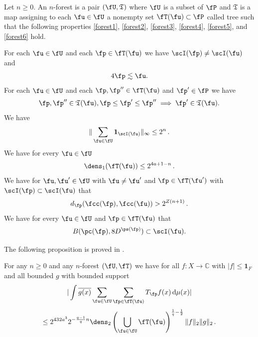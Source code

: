 Let $n\ge 0$.
An $n$-forest is a pair $(\fU, \mathfrak{T})$
where $\fU$ is a subset of $\fP$
and $\mathfrak{T}$ is a map assigning to
each $\fu\in \fU$ a nonempty set $\fT (\fu)\subset \fP$ called tree
such that the following properties
\eqref{forest1}, \eqref{forest2},
\eqref{forest3},
\eqref{forest4},
\eqref{forest5}, and
\eqref{forest6}
hold.

For each $\fu\in \fU$ and each $\fp\in \fT(\fu)$
we have $\scI(\fp) \ne \scI(\fu)$ and
\begin{equation}\label{forest1}
    4\fp\lesssim \fu.
\end{equation}
For each $\fu \in \fU$ and each $\fp,\fp''\in \fT(\fu)$ and $\fp'\in \fP$
we have
\begin{equation}\label{forest2}
    \fp, \fp'' \in \mathfrak{T}(\fu), \fp \leq \fp' \leq \fp'' \implies \fp' \in \mathfrak{T}(\fu).
\end{equation}
We have
\begin{equation}\label{forest3}
   \|\sum_{\fu\in \fU} \mathbf{1}_{\scI(\fu)}\|_\infty \leq 2^n\,.
\end{equation}
We have for every $\fu\in \fU$
\begin{equation}\label{forest4}
    \dens_1(\fT(\fu))\le 2^{4a + 1-n}\, .
\end{equation}
We have for $\fu, \fu'\in \fU$ with $\fu\neq \fu'$ and $\fp\in \fT(\fu')$ with $\scI(\fp)\subset \scI(\fu)$ that
\begin{equation}\label{forest5}
    d_{\fp}(\fcc(\fp), \fcc(\fu))>2^{Z(n+1)}\, .
\end{equation}
We have for every $\fu\in \fU$ and $\fp\in \fT(\fu)$ that
\begin{equation}\label{forest6}
    B(\pc(\fp), 8D^{\ps(\fp)})\subset \scI(\fu).
\end{equation}


The following proposition is proved in .
\begin{proposition}
\label{forest-operator}
\leanok
{}
For any $n\ge 0$ and any $n$-forest $(\fU,\fT)$ we have for all $f: X \to \mathbb{C}$ with $|f| \le \mathbf{1}_F$ and all bounded $g$ with bounded support
$$
    | \int \overline{g(x)} \sum_{\fu\in \fU} \sum_{\fp\in \fT(\fu)} T_{\fp} f(x) \, \mathrm{d}\mu(x)|
$$
$$
    \le
    2^{432a^3}2^{-\frac{q-1}{q} n} \dens_2\left(\bigcup_{\fu\in \fU}\fT(\fu)\right)^{\frac{1}{q}-\frac{1}{2}} \|f\|_2 \|g\|_2 \,.
$$
\end{proposition}


